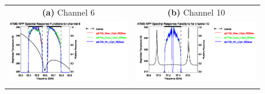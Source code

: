 \begin{figure}[htp]
  \centering
  \begin{tabular}{c c}
    \textsf{\textbf{(a)} Channel 6} &
    \textsf{\textbf{(b)} Channel 10} \\
    \includegraphics[bb=70 400 300 559,clip,scale=1.0]{graphics/srf/Vset/atms_npp.ch6.osrf.eps} &
    \includegraphics[bb=70 400 300 559,clip,scale=1.0]{graphics/srf/Vset/atms_npp.ch10.osrf.eps} \\\\


\end{tabular}
\end{figure}
